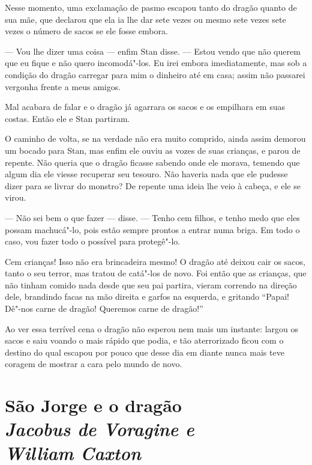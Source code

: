 Nesse momento, uma exclamação de pasmo escapou tanto do dragão quanto
de sua mãe, que declarou que ela ia lhe dar sete vezes ou mesmo sete
vezes sete vezes o número de sacos se ele fosse embora.

--- Vou lhe dizer uma coisa --- enfim Stan disse. --- Estou vendo que não
querem que eu fique e não quero incomodá"-los. Eu irei embora
imediatamente, mas sob a condição do dragão carregar para mim o
dinheiro até em casa; assim não passarei vergonha frente a meus
amigos.

Mal acabara de falar e o dragão já agarrara os sacos e os empilhara em
suas costas. Então ele e Stan partiram.

O caminho de volta, se na verdade não era muito comprido, ainda assim
demorou um bocado para Stan, mas enfim ele ouviu as vozes de suas
crianças, e parou de repente. Não queria que o dragão ficasse sabendo
onde ele morava, temendo que algum dia ele viesse recuperar seu
tesouro. Não haveria nada que ele pudesse dizer para se livrar do
monstro? De repente uma ideia lhe veio à cabeça, e ele se virou.

--- Não sei bem o que fazer --- disse. --- Tenho cem filhos, e tenho medo
que eles possam machucá"-lo, pois estão sempre prontos a entrar numa
briga. Em todo o caso, vou fazer todo o possível para protegê"-lo.

Cem crianças! Isso não era brincadeira mesmo! O dragão até deixou cair
os sacos, tanto o seu terror, mas tratou de catá"-los de novo. Foi
então que as crianças, que não tinham comido nada desde que seu pai
partira, vieram correndo na direção dele, brandindo facas na mão
direita e garfos na esquerda, e gritando “Papai! Dê"-nos carne de
dragão! Queremos carne de dragão!”

Ao ver essa terrível cena o dragão não esperou nem mais um instante:
largou os sacos e saiu voando o mais rápido que podia, e tão
aterrorizado ficou com o destino do qual escapou por pouco que desse
dia em diante nunca mais teve coragem de mostrar a cara pelo mundo de
novo.

\chapter[São Jorge e o dragão\\{\itshape Jacobus de Voragine e William Caxton}]{São Jorge e o dragão\\{\LARGE\itshape Jacobus de Voragine e\\ William Caxton}}

